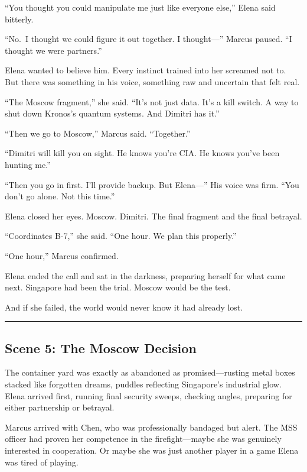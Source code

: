 ``You thought you could manipulate me just like everyone else,'' Elena
said bitterly.

``No.~I thought we could figure it out together. I thought---'' Marcus
paused. ``I thought we were partners.''

Elena wanted to believe him. Every instinct trained into her screamed
not to. But there was something in his voice, something raw and
uncertain that felt real.

``The Moscow fragment,'' she said. ``It's not just data. It's a kill
switch. A way to shut down Kronos's quantum systems. And Dimitri has
it.''

``Then we go to Moscow,'' Marcus said. ``Together.''

``Dimitri will kill you on sight. He knows you're CIA. He knows you've
been hunting me.''

``Then you go in first. I'll provide backup. But Elena---'' His voice
was firm. ``You don't go alone. Not this time.''

Elena closed her eyes. Moscow. Dimitri. The final fragment and the final
betrayal.

``Coordinates B-7,'' she said. ``One hour. We plan this properly.''

``One hour,'' Marcus confirmed.

Elena ended the call and sat in the darkness, preparing herself for what
came next. Singapore had been the trial. Moscow would be the test.

And if she failed, the world would never know it had already lost.

\begin{center}\rule{0.5\linewidth}{0.5pt}\end{center}

\hypertarget{scene-5-the-moscow-decision}{%
\subsection{Scene 5: The Moscow
Decision}\label{scene-5-the-moscow-decision}}

The container yard was exactly as abandoned as promised---rusting metal
boxes stacked like forgotten dreams, puddles reflecting Singapore's
industrial glow. Elena arrived first, running final security sweeps,
checking angles, preparing for either partnership or betrayal.

Marcus arrived with Chen, who was professionally bandaged but alert. The
MSS officer had proven her competence in the firefight---maybe she was
genuinely interested in cooperation. Or maybe she was just another
player in a game Elena was tired of playing.

